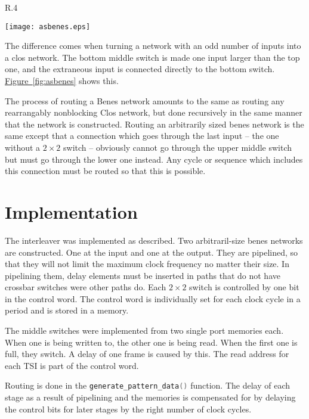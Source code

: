 \documentclass[
	utf8,
	largesmallcaps,
	intlimits,
	widermath,
	sharecounter,
	nobreak,
	definition=marks,
	numbers,
	noparts
]{rtthesis}
\newcommand{\Figureref}[1]{\hyperref[#1]{Figure~\ref*{#1}}}
\begin{document}
\begin{wrapfigure}{R}{.4\textwidth}
\begin{center}
\texttt{[image: asbenes.eps]}
\end{center}
\caption{
One step in the construction of an Arbitrary Size Benes Network.
}
\label{fig:asbenes}
\end{wrapfigure}

The difference comes when turning a network with an odd number of inputs into a
clos network. The bottom middle switch is made one input larger than the top
one, and the extraneous input is connected directly to the bottom switch.
\Figureref{fig:asbenes} shows this.

The process of routing a Benes network amounts to the same as routing any
rearrangably nonblocking Clos network, but done recursively in the same manner
that the network is constructed. Routing an arbitrarily sized benes network is
the same except that a connection which goes through the last input -- the one
without a $2 \times 2$ switch -- obviously cannot go through the upper middle
switch but must go through the lower one instead. Any cycle or sequence which
includes this connection must be routed so that this is possible.

\section{Implementation}

The interleaver was implemented as described. Two arbitraril-size benes
networks are constructed. One at the input and one at the output. They are
pipelined, so that they will not limit the maximum clock frequency no matter
their size. In pipelining them, delay elements must be inserted in paths that
do not have crossbar switches were other paths do. Each $2 \times 2$ switch is
controlled by one bit in the control word. The control word is individually set
for each clock cycle in a period and is stored in a memory.

The middle switches were implemented from two single port memories each. When
one is being written to, the other one is being read. When the first one is
full, they switch. A delay of one frame is caused by this. The read address for
each TSI is part of the control word.

Routing is done in the \lstinline[language=C]{generate_pattern_data()}
function. The delay of each stage as a result of pipelining and the memories is
compensated for by delaying the control bits for later stages by the right
number of clock cycles.
\end{document}
